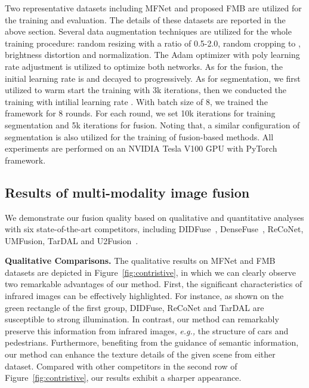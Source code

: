 \documentclass[10pt,twocolumn,letterpaper]{article}
\begin{document}
Two representative datasets including MFNet and proposed FMB  are utilized for the training and evaluation. The details of these datasets are reported in the above section. Several data augmentation techniques are utilized for the whole training procedure: random resizing with a ratio of 0.5-2.0, random cropping to ,  brightness distortion and normalization. The Adam optimizer with poly learning rate adjustment is utilized to optimize both networks. As for the fusion, the initial learning rate is  and decayed to  progressively. As for segmentation, we first utilized  to warm start the training with 3k iterations, then we conducted the training with intilial learning rate .
With batch size of 8, we trained the framework for 8 rounds. For each round, we set 10k iterations for training segmentation and 5k iterations for fusion. Noting that, a similar configuration of segmentation is also utilized for the training of fusion-based methods. All experiments are performed on an NVIDIA Tesla V100 GPU with PyTorch framework.


\subsection{Results of multi-modality image fusion}
We demonstrate our fusion quality based on qualitative and quantitative analyses with six state-of-the-art competitors, including  DIDFuse~\cite{zhao2020didfuse}, DenseFuse~\cite{li2018densefuse}, ReCoNet\cite{reconet}, UMFusion\cite{UMFusion}, TarDAL\cite{TarDAL} and U2Fusion~\cite{U2Fusion2020}. 

\noindent\textbf{Qualitative Comparisons.}
The qualitative results on MFNet and FMB datasets are depicted  in Figure~\ref{fig:contristive}, in which we can clearly observe two remarkable advantages of our method. First, the significant characteristics of infrared images can be effectively highlighted. For instance, as shown on the green rectangle of the first group, DIDFuse, ReCoNet and TarDAL are susceptible to strong illumination. In contrast, our method can remarkably preserve this information from infrared images, \emph{e.g.,} the structure of cars and pedestrians.  Furthermore,  benefiting from the guidance of semantic information, our method can enhance the texture details of the given scene from either dataset. Compared with other competitors in the second row of Figure~\ref{fig:contristive}, our results exhibit a sharper appearance.
\end{document}
